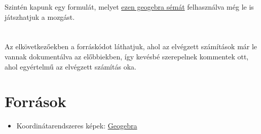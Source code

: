 \documentclass[a4paper]{article}
\begin{document}
	Szintén kapunk egy formulát, melyet \href{https://www.geogebra.org/m/fsurybdc}{ezen geogebra sémát} felhasználva még le is játszhatjuk a mozgást. \\
	 \\
	\\
	Az elkövetkezőekben a forráskódot láthatjuk, ahol az elvégzett számítások már le vannak dokumentálva az előbbiekben, így kevésbé szerepelnek kommentek ott, ahol egyértelmű az elvégzett számítás oka.
	
	
	
	
	
	
	
	

\section{Források}
	\begin{itemize}
		\item Koordinátarendszeres képek: \href{https://www.geogebra.org/}{Geogebra}
	\end{itemize}
 
\end{document}
